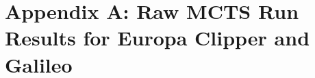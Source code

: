 \documentclass[letterpaper, preprint, paper,11pt]{AAS}	%
\begin{document}

\appendix
\clearpage
\section*{Appendix A: Raw MCTS Run Results for Europa Clipper and Galileo}
\end{document}

